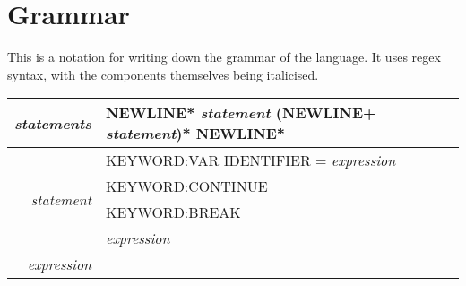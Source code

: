 \section{Grammar}

This is a notation for writing down the grammar of the language.  It uses regex syntax, with the components themselves being italicised.

\begin{tabular}{|r|l|}
\hline
\textit{statements} & NEWLINE* \textit{statement} (NEWLINE+ \textit{statement})* NEWLINE* \\\hline
\multirow{4}{*}{\textit{statement}} & KEYWORD:VAR IDENTIFIER = \textit{expression} \\
                                    & KEYWORD:CONTINUE \\
                                    & KEYWORD:BREAK \\
                                    & \textit{expression} \\\hline
\textit{expression} & \\\hline
\end{tabular}
